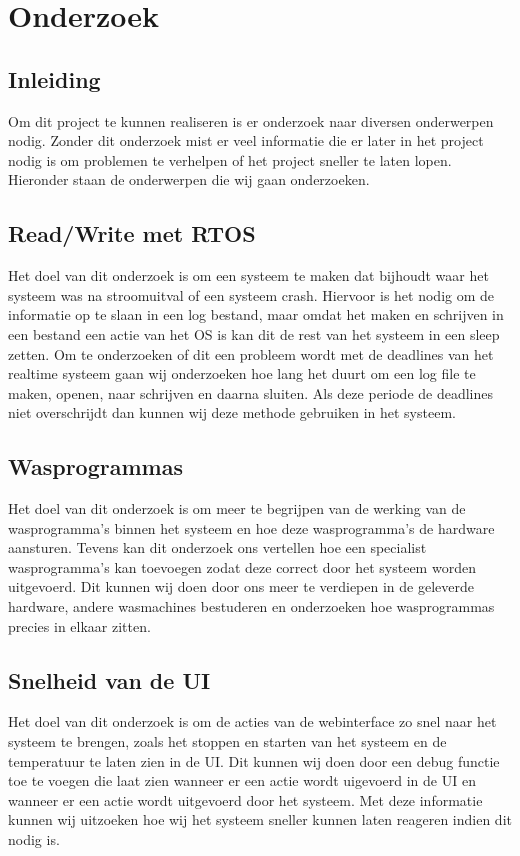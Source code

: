 \chapter{Onderzoek}
\section{Inleiding}
Om dit project te kunnen realiseren is er onderzoek naar diversen onderwerpen nodig. Zonder dit onderzoek mist er veel informatie die er later in het project nodig is om problemen te verhelpen of het project sneller te laten lopen.
Hieronder staan de onderwerpen die wij gaan onderzoeken.

\section{Read/Write met RTOS}
Het doel van dit onderzoek is om een systeem te maken dat bijhoudt waar het systeem was na stroomuitval of een systeem crash. Hiervoor is het nodig om de informatie op te slaan in een log bestand, maar omdat het maken en schrijven in een bestand een actie van het OS is kan dit de rest van het systeem in een sleep zetten. 
Om te onderzoeken of dit een probleem wordt met de deadlines van het realtime systeem gaan wij onderzoeken hoe lang het duurt om een log file te maken, openen, naar schrijven en daarna sluiten. Als deze periode de deadlines niet overschrijdt dan kunnen wij deze methode gebruiken in het systeem.

\section{Wasprogrammas}
Het doel van dit onderzoek is om meer te begrijpen van de werking van de wasprogramma's binnen het systeem en hoe deze wasprogramma's de hardware aansturen. Tevens kan dit onderzoek ons vertellen hoe een specialist wasprogramma's kan toevoegen zodat deze correct door het systeem worden uitgevoerd.
Dit kunnen wij doen door ons meer te verdiepen in de geleverde hardware, andere wasmachines bestuderen en onderzoeken hoe wasprogrammas precies in elkaar zitten.

\section{Snelheid van de UI}
Het doel van dit onderzoek is om de acties van de webinterface zo snel naar het systeem te brengen, zoals het stoppen en starten van het systeem en de temperatuur te laten zien in de UI.
Dit kunnen wij doen door een debug functie toe te voegen die laat zien wanneer er een actie wordt uigevoerd in de UI en wanneer er een actie wordt uitgevoerd door het systeem. Met deze informatie kunnen wij uitzoeken hoe wij het systeem sneller kunnen laten reageren indien dit nodig is.